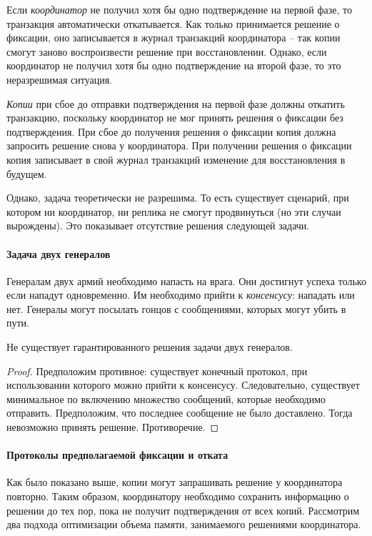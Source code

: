 Если \textit{координатор} не получил хотя бы одно подтверждение на первой фазе, то транзакция
автоматически откатывается. Как только принимается решение о фиксации, оно записывается в журнал
транзакций координатора -- так копии смогут заново воспроизвести решение при восстановлении.
Однако, если координатор не получил хотя бы одно подтверждение на второй фазе, то это неразрешимая
ситуация.

\textit{Копии} при сбое до отправки подтверждения на первой фазе должны откатить
транзакцию, поскольку координатор не мог принять решения о фиксации без подтверждения. При сбое до
получения решения о фиксации копия должна запросить решение снова у координатора. При получении
решения о фиксации копия записывает в свой журнал транзакций изменение для восстановления в
будущем.

Однако, задача теоретически не разрешима. То есть существует сценарий, при котором ни координатор,
ни реплика не смогут продвинуться (но эти случаи вырождены). Это показывает отсутствие решения
следующей задачи.

\paragraph{Задача двух генералов}

Генералам двух армий необходимо напасть на врага. Они достигнут успеха только если нападут
одновременно. Им необходимо прийти к \textit{консенсусу}: нападать или нет. Генералы могут
посылать гонцов с сообщениями, которых могут убить в пути.

\begin{proposition}
	Не существует гарантированного решения задачи двух генералов.
\end{proposition}

\begin{proof}
	Предположим противное: существует конечный протокол, при использовании которого можно прийти к
	консенсусу. Следовательно, существует минимальное по включению множество сообщений, которые
	необходимо отправить. Предположим, что последнее сообщение не было доставлено. Тогда невозможно
	принять решение. Противоречие.
\end{proof}

\paragraph{Протоколы предполагаемой фиксации и отката}

Как было показано выше, копии могут запрашивать решение у координатора повторно. Таким образом,
координатору необходимо сохранить информацию о решении до тех пор, пока не получит подтверждения от
всех копий. Рассмотрим два подхода оптимизации объема памяти, занимаемого решениями координатора.

